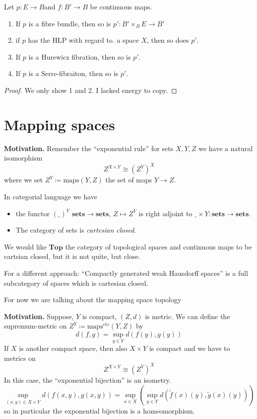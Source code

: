 \documentclass[language=english]{TemplateLecture}
\begin{document}
\begin{thm}
    Let \(p \colon E \to B\)and \(f\colon B' \to B\) be continuous maps.
    \begin{enumerate}
        \item If \(p\) is a fibre bundle, then so is \(p'\colon B' \times_B E \to B'\)
        \item if \(p\) has the HLP with regard to. a space \(X\), then so does \(p'\).
        \item If \(p\) is a Hurewicz fibration, then so is \(p'\).
        \item If \(p\) is a Serre-fibraiton, then so is \(p'\).
    \end{enumerate}
\end{thm}

\begin{proof}
    We only show 1 and 2. I lacked energy to copy.
\end{proof}


\section{Mapping spaces}

\textbf{Motivation.} Remember the \enquote{exponential rule} for sets \(X,Y,Z\) we have a natural isomorphism
\[Z^{X\times Y} \cong (Z^Y)^X\]
where we set \(Z^Y \coloneq \mathrm{maps}(Y,Z)\) the set of maps \(Y\to Z\).

In categorial language we have
\begin{itemize}
    \item the functor \((\_)^Y\) \(\mathbf{sets} \to \mathbf{sets}\), \(Z \mapsto Z^Y\) is right adjoint to \(\_\times Y\colon \mathbf{sets} \to \mathbf{sets}\).
    \item The category of sets is \emph{cartesian closed}.
\end{itemize}

We would like \(\mathbf{Top}\) the category of topological spaces and continuous maps to be cartsian closed, but it is not quite, but close.

For a different approach: \enquote{Compactly generated weak Hausdorff spaces} is a full subcategory of spaces which is cartesian closed. 

For now we are talking about the mapping space topology

\textbf{Motivation.} Suppose, \(Y\) is compact, \((Z, d)\) is metric. We can define the supremum-metric on \(Z^Y \coloneq \mathrm{maps}^{cts}(Y,Z)\) by
\[d(f,g) = \sup_{y \in Y} d(f(y), g(y))\]
If \(X\) is another compact space, then also \(X \times Y\) is compact and we have to metrics on
\[Z^{X \times Y} \cong (Z^Y)^X\]
In this case, the \enquote{exponential bijection} is an isometry.
\[\sup_{(x,y) \in X\times Y} d(f(x,y), g(x,y)) = \sup_{x \in X}(\sup_{y\in Y} d(\tilde f(x)(y),\tilde g(x)(y)))\]
so in particular the exponential bijection is a homeomorphism.
\end{document}
